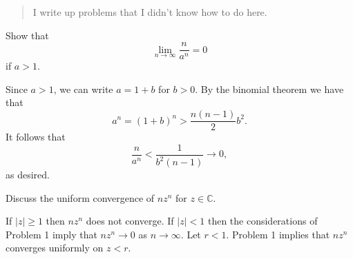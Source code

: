 



\begin{abstract}
I write up problems that I didn't know how to do here.
\end{abstract}

\begin{problem}
Show that 
\[\lim_{n \to \infty}\frac{n}{a^n} = 0\] if $a > 1$.
\end{problem}

\begin{solution}
Since $a > 1$, we can write $a = 1 + b$ for $b > 0$. By the binomial theorem we have that 
\[a^n = (1 + b)^n > \frac{n(n-1)}{2}b^2.\]
It follows that 
\[\frac{n}{a^n} < \frac{1}{b^2(n-1)} \to 0,\]
as desired.
\end{solution}

\begin{problem}
Discuss the uniform convergence of $nz^n$ for $z \in \mathbb{C}$.
\end{problem}
\begin{solution}
If $|z| \geq 1$ then $nz^n$ does not converge. If $|z| < 1$ then the considerations of Problem 1 imply that $nz^n \to 0$ as $n \to \infty$. Let $r < 1$. Problem 1 implies that $nz^n$ converges uniformly on $z < r$. 
\end{solution}
